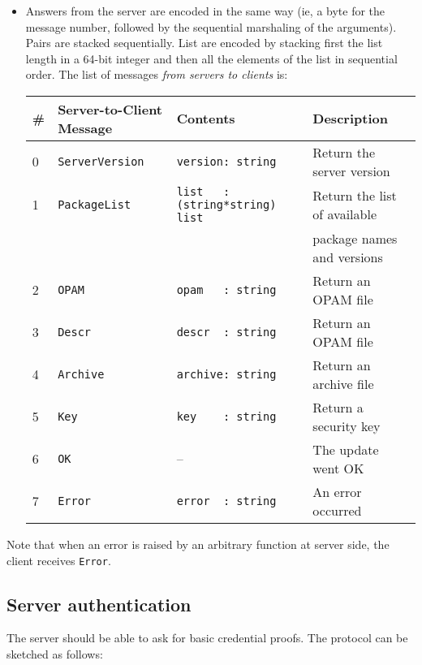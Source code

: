 \documentclass[a4paper,11pt]{article}
\begin{document}
\begin{itemize}
\item Answers from the server are encoded in the same way (ie, a byte
  for the message number, followed by the sequential marshaling of the
  arguments). Pairs are stacked sequentially. List are encoded by
  stacking first the list length in a 64-bit integer and then all
  the elements of the list in sequential order. The list of messages
  {\em from servers to clients} is:

{\small
\begin{tabular}{|l|l|l|l|}
\hline
\# & Server-to-Client Message & Contents & Description \\
\hline
\hline
0 & \verb+ServerVersion+ & \verb+version: string+  & Return the server version \\
\hline
1 & \verb+PackageList+  & \verb+list   : (string*string) list+ & Return the list of available \\
  &                     &                                      & package names and versions \\
\hline
2 & \verb+OPAM+         & \verb+opam   : string+ & Return an OPAM file
\\
3 & \verb+Descr+        & \verb+descr  : string+ & Return an OPAM file \\
\hline
4 & \verb+Archive+      & \verb+archive: string+ & Return an archive file \\
\hline
5 & \verb+Key+          & \verb+key    : string+ & Return a security key \\
\hline
6 & \verb+OK+           & --                     & The update went OK \\
\hline
7 & \verb+Error+        & \verb+error  : string+ & An error occurred \\
\hline
\end{tabular}
}

\end{itemize}

Note that when an error is raised by an arbitrary function
 at server side, the client receives \verb|Error|.

\subsection{Server authentication}

The server should be able to ask for basic credential proofs. The
protocol can be sketched as follows:
\end{document}
